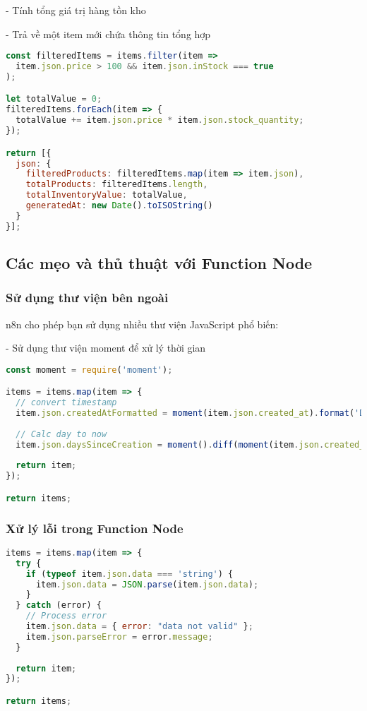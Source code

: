 - Tính tổng giá trị hàng tồn kho

- Trả về một item mới chứa thông tin tổng hợp

\begin{lstlisting}[language=JavaScript]
const filteredItems = items.filter(item => 
  item.json.price > 100 && item.json.inStock === true
);

let totalValue = 0;
filteredItems.forEach(item => {
  totalValue += item.json.price * item.json.stock_quantity;
});

return [{
  json: {
    filteredProducts: filteredItems.map(item => item.json),
    totalProducts: filteredItems.length,
    totalInventoryValue: totalValue,
    generatedAt: new Date().toISOString()
  }
}];
\end{lstlisting}

\subsection{Các mẹo và thủ thuật với Function Node}

\subsubsection{Sử dụng thư viện bên ngoài}

n8n cho phép bạn sử dụng nhiều thư viện JavaScript phổ biến:

- Sử dụng thư viện moment để xử lý thời gian

\begin{lstlisting}[language=JavaScript]
const moment = require('moment');

items = items.map(item => {
  // convert timestamp 
  item.json.createdAtFormatted = moment(item.json.created_at).format('DD/MM/YYYY HH:mm');
  
  // Calc day to now
  item.json.daysSinceCreation = moment().diff(moment(item.json.created_at), 'days');
  
  return item;
});

return items;
\end{lstlisting}
\subsubsection{Xử lý lỗi trong Function Node}

\begin{lstlisting}[language=JavaScript]
items = items.map(item => {
  try {
    if (typeof item.json.data === 'string') {
      item.json.data = JSON.parse(item.json.data);
    }
  } catch (error) {
    // Process error
    item.json.data = { error: "data not valid" };
    item.json.parseError = error.message;
  }
  
  return item;
});

return items;
\end{lstlisting}

